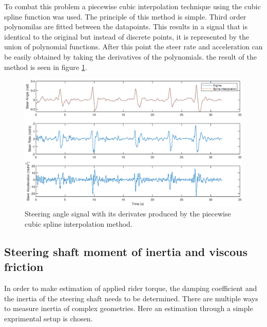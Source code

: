 To combat this problem a piecewise cubic interpolation technique using the cubic spline function was used. The principle of this method is simple. Third order polynomilas are fitted   between the datapoints. This results in a signal that is identical to the original but instead of discrete points, it is represented by the union of polynomial functions. After this point the steer rate and acceleration can be easily obtained by taking the derivatives of the polynomials. the result of the method is seen in figure \ref{fig:spline}. 
\begin{figure}[ht]
    \centering
    \captionsetup{justification=centering,margin=2cm}

    \includegraphics[scale=0.6]{images/steer_rates_spline.eps}
    \caption{Steering angle signal with its derivates produced by the piecewise cubic spline interpolation method.}
    \label{fig:spline}
\end{figure}
\subsection{Steering shaft moment of inertia and viscous friction}

In order to make estimation of applied rider torque, the damping coefficient and the inertia of the steering shaft needs to be determined. There are multiple ways to measure inertia of complex geometries. Here an estimation through a simple exprimental setup is chosen.

